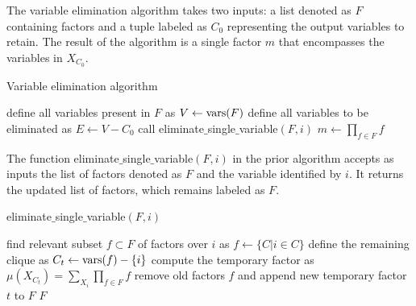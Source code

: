 \documentclass[12pt, a4paper]{report}
\begin{document}
    The variable elimination algorithm takes two inputs: a list denoted as $F$ containing factors and a tuple labeled as $C_0$ representing the output variables to retain. 
    The result of the algorithm is a single factor $m$ that encompasses the variables in $X_{C_0}$.
    \begin{algorithm}[H]
        \caption{Variable elimination algorithm}
            \begin{algorithmic}[1]
                \State define all variables present in $F$ as $V\leftarrow\textnormal{vars}(F)$
                \State define all variables to be eliminated as $E\leftarrow V-C_0$
                    \State call eliminate$\_$single$\_$variable$(F,i)$
                \EndFor
                    \State $m \leftarrow \prod_{f \in F}f$
                \EndFor
            \end{algorithmic}
    \end{algorithm}
    The function eliminate$\_$single$\_$variable$(F,i)$ in the prior algorithm accepts as inputs the list of factors denoted as $F$ and the variable identified by $i$. 
    It returns the updated list of factors, which remains labeled as $F$.
    \begin{algorithm}[H]
        \caption{eliminate$\_$single$\_$variable$(F,i)$}
            \begin{algorithmic}[1]
                \State find relevant subset $f \subset F$ of factors over $i$ as $f \leftarrow\{C|i\in C\}$
                \State define the remaining clique as $C_t \leftarrow \textnormal{vars}(f)-\{i\}$
                \State compute the temporary factor as $\mu(X_{C_t})=\sum_{X_i}\prod_{f \in F}f$
                \State remove old factors $f$ and append new temporary factor $t$ to $F$
                \State \Return $F$
            \end{algorithmic}
    \end{algorithm}
\end{document}
